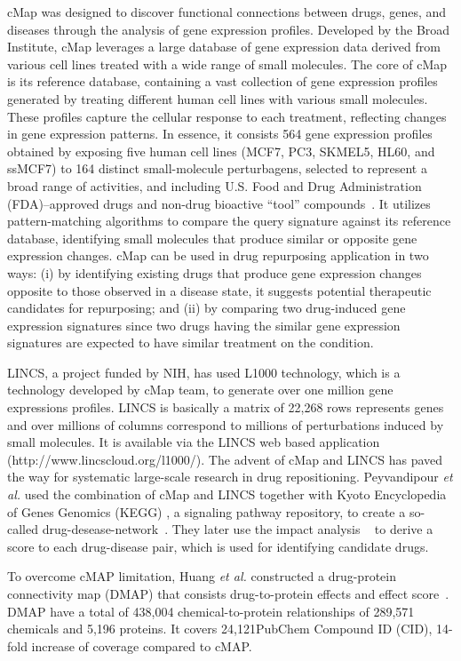 cMap was designed to discover functional connections between drugs, genes, and diseases through the analysis of gene expression profiles. Developed by the Broad Institute, cMap leverages a large database of gene expression data derived from various cell lines treated with a wide range of small molecules.
The core of cMap is its reference database, containing a vast collection of gene expression profiles generated by treating different human cell lines with various small molecules. These profiles capture the cellular response to each treatment, reflecting changes in gene expression patterns.
In essence, it consists 564 gene expression profiles obtained by exposing five human cell lines (MCF7, PC3, SKMEL5, HL60, and ssMCF7) to 164 distinct small-molecule perturbagens, selected to represent a broad range of activities, and including U.S. Food and Drug Administration (FDA)–approved drugs and non-drug bioactive “tool” compounds~\cite{lamb2006connectivity}. 
It utilizes pattern-matching algorithms to compare the query signature against its reference database, identifying small molecules that produce similar or opposite gene expression changes.
cMap can be used in drug repurposing application in two ways: (i) by identifying existing drugs that produce gene expression changes opposite to those observed in a disease state, it suggests potential therapeutic candidates for repurposing; and (ii) by comparing two drug-induced gene expression signatures since two drugs having the similar gene expression signatures are expected to have similar treatment on the condition.

LINCS, a project funded by NIH, has used L1000 technology, which is a technology developed by cMap team, to generate over one million gene expressions profiles. LINCS is basically a matrix of 22,268 rows represents genes and over millions of columns correspond to millions of perturbations induced by small molecules. It is available via the LINCS web based application (http://www.lincscloud.org/l1000/). The advent of cMap and LINCS has paved the way for systematic large-scale research in drug repositioning.  Peyvandipour \textit{et al.} used the combination of cMap and LINCS together with Kyoto Encyclopedia of Genes Genomics (KEGG) \cite{ogata1999kegg}, a signaling pathway repository, to create a so-called drug-desease-network~\cite{peyvandipour2018novel}. They later use the impact analysis ~\cite{draghici2007systems} to derive a score to each drug-disease pair, which is used for identifying candidate drugs.

To overcome cMAP limitation, Huang \textit{et al.} constructed a drug-protein connectivity map (DMAP) that consists drug-to-protein effects and effect score~\cite{huang2015dmap}. DMAP have a total of 438,004 chemical-to-protein relationships of 289,571 chemicals and 5,196 proteins. It covers 24,121PubChem Compound ID (CID), 14-fold increase of coverage compared to cMAP. 

